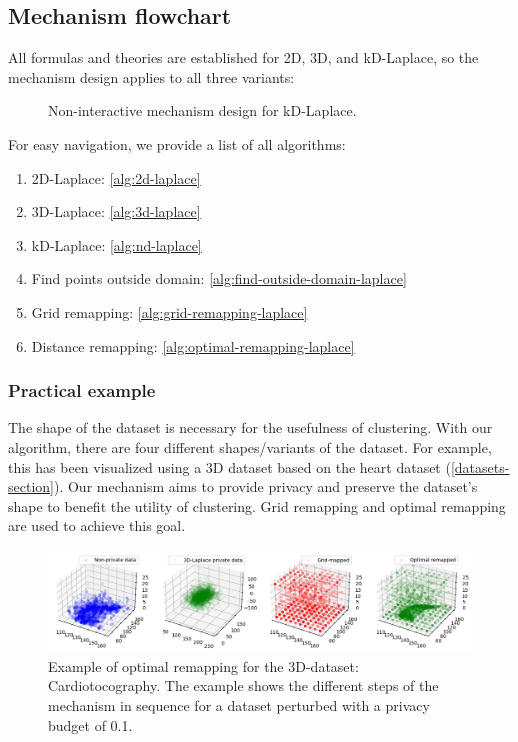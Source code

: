 \subsection{Mechanism flowchart}
All formulas and theories are established for 2D, 3D, and kD-Laplace, so the mechanism design applies to all three variants:
\begin{figure}[H]
  
  \caption{Non-interactive mechanism design for kD-Laplace.}
  \label{fig:final-mechanism-design}
\end{figure}
For easy navigation, we provide a list of all algorithms:
\begin{enumerate}
  \item 2D-Laplace:  \ref{alg:2d-laplace}
  \item 3D-Laplace: \ref{alg:3d-laplace}
  \item kD-Laplace: \ref{alg:nd-laplace}
  \item Find points outside domain: \ref{alg:find-outside-domain-laplace}
  \item Grid remapping: \ref{alg:grid-remapping-laplace}
  \item Distance remapping: \ref{alg:optimal-remapping-laplace}
\end{enumerate}
\subsubsection{Practical example}
The shape of the dataset is necessary for the usefulness of clustering.
With our algorithm, there are four different shapes/variants of the dataset.
For example, this has been visualized using a 3D dataset based on the heart dataset (\ref{datasets-section}).
Our mechanism aims to provide privacy and preserve the dataset's shape to benefit the utility of clustering.
Grid remapping and optimal remapping are used to achieve this goal.

\begin{figure}[H]
  \includegraphics[width=1.1\textwidth]{TheorethicalFramework/ND-Laplace/Images/optimal-remapping-example.png}
  \caption{Example of optimal remapping for the 3D-dataset: Cardiotocography. The example shows the different steps of the mechanism in sequence for a dataset perturbed with a privacy budget of 0.1.}
\end{figure}

